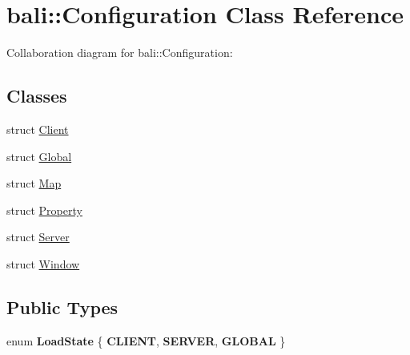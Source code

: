 \hypertarget{classbali_1_1_configuration}{\section{bali\-:\-:Configuration Class Reference}
\label{classbali_1_1_configuration}
}


Collaboration diagram for bali\-:\-:Configuration\-:
\subsection*{Classes}
\begin{DoxyCompactItemize}
\item 
struct \hyperlink{structbali_1_1_configuration_1_1_client}{Client}
\item 
struct \hyperlink{structbali_1_1_configuration_1_1_global}{Global}
\item 
struct \hyperlink{structbali_1_1_configuration_1_1_map}{Map}
\item 
struct \hyperlink{structbali_1_1_configuration_1_1_property}{Property}
\item 
struct \hyperlink{structbali_1_1_configuration_1_1_server}{Server}
\item 
struct \hyperlink{structbali_1_1_configuration_1_1_window}{Window}
\end{DoxyCompactItemize}
\subsection*{Public Types}
\begin{DoxyCompactItemize}
\item 
enum {\bfseries Load\-State} \{ {\bfseries C\-L\-I\-E\-N\-T}, 
{\bfseries S\-E\-R\-V\-E\-R}, 
{\bfseries G\-L\-O\-B\-A\-L}
 \}
\end{DoxyCompactItemize}
